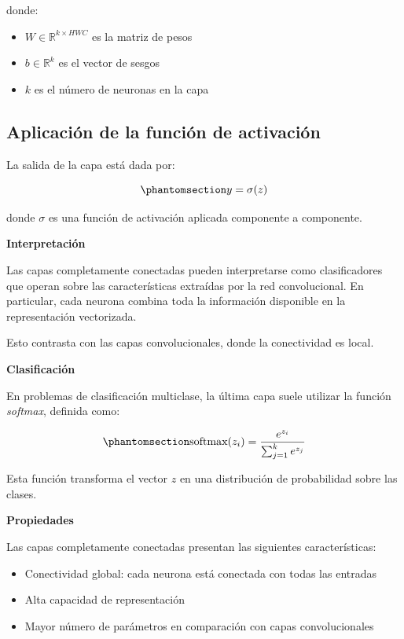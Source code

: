 \documentclass[
  spanish,
  us-letterpaper,
]{scrreprt}
\providecommand{\tightlist}{%
  \setlength{\itemsep}{0pt}\setlength{\parskip}{0pt}}
\theoremstyle{definition}
\theoremstyle{remark}
\begin{document}
donde:

\begin{itemize}
\tightlist
\item
  \(W \in \mathbb{R}^{k \times HWC}\) es la matriz de pesos
\item
  \(b \in \mathbb{R}^{k}\) es el vector de sesgos
\item
  \(k\) es el número de neuronas en la capa
\end{itemize}

\subsection{Aplicación de la función de
activación}\label{aplicaciuxf3n-de-la-funciuxf3n-de-activaciuxf3n}

La salida de la capa está dada por:

\begin{equation}\phantomsection\label{eq-fc-activacion}{
y = \sigma(z)
}\end{equation}

donde \(\sigma\) es una función de activación aplicada componente a
componente.

\textbf{Interpretación}

Las capas completamente conectadas pueden interpretarse como
clasificadores que operan sobre las características extraídas por la red
convolucional. En particular, cada neurona combina toda la información
disponible en la representación vectorizada.

Esto contrasta con las capas convolucionales, donde la conectividad es
local.

\textbf{Clasificación}

En problemas de clasificación multiclase, la última capa suele utilizar
la función \emph{softmax}, definida como:

\begin{equation}\phantomsection\label{eq-softmax}{
\text{softmax}(z_i) =
\frac{e^{z_i}}{\sum_{j=1}^{k} e^{z_j}}
}\end{equation}

Esta función transforma el vector \(z\) en una distribución de
probabilidad sobre las clases.

\textbf{Propiedades}

Las capas completamente conectadas presentan las siguientes
características:

\begin{itemize}
\tightlist
\item
  Conectividad global: cada neurona está conectada con todas las
  entradas
\item
  Alta capacidad de representación
\item
  Mayor número de parámetros en comparación con capas convolucionales
\end{itemize}
\end{document}

